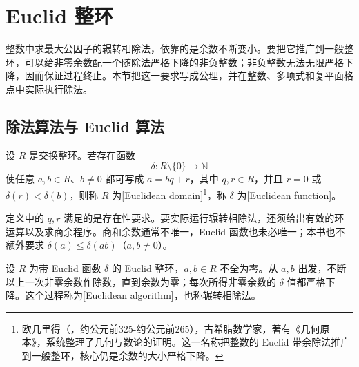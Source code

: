 
\section{Euclid 整环}
\label{b1:sec:1102}

%
%

整数中求最大公因子的辗转相除法，依靠的是余数不断变小。要把它推广到一般整环，可以给非零余数配一个随除法严格下降的非负整数；非负整数无法无限严格下降，因而保证过程终止。本节把这一要求写成公理，并在整数、多项式和复平面格点中实际执行除法。

\subsection{除法算法与 Euclid 算法}
\label{b1:subsec:1102:01}

\begin{definition}\label{b1:def:euclidean-domain}
	设 \(R\) 是交换整环。若存在函数
	\[
		\delta:R\setminus\{0\}\longrightarrow\mathbb N
	\]
	使任意 \(a,b\in R\)、\(b\ne0\) 都可写成 \(a=bq+r\)，其中 \(q,r\in R\)，并且 \(r=0\) 或 \(\delta(r)<\delta(b)\)，则称 \(R\) 为[Euclidean domain]\footnote{欧几里得（，约公元前325-约公元前265），古希腊数学家，著有《几何原本》，系统整理了几何与数论的证明。这一名称把整数的 Euclid 带余除法推广到一般整环，核心仍是余数的大小严格下降。}，称 \(\delta\) 为[Euclidean function]。
\end{definition}

定义中的 \(q,r\) 满足的是存在性要求。要实际运行辗转相除法，还须给出有效的环运算以及求商余程序。商和余数通常不唯一，Euclid 函数也未必唯一；本书也不额外要求 \(\delta(a)\leq\delta(ab)\)（\(a,b\ne0\)）。

\ProseParagraphBreak
设 \(R\) 为带 Euclid 函数 \(\delta\) 的 Euclid 整环，\(a,b\in R\) 不全为零。从 \(a,b\) 出发，不断以上一次非零余数作除数，直到余数为零；每次所得非零余数的 \(\delta\) 值都严格下降。这个过程称为[Euclidean algorithm]，也称辗转相除法。

